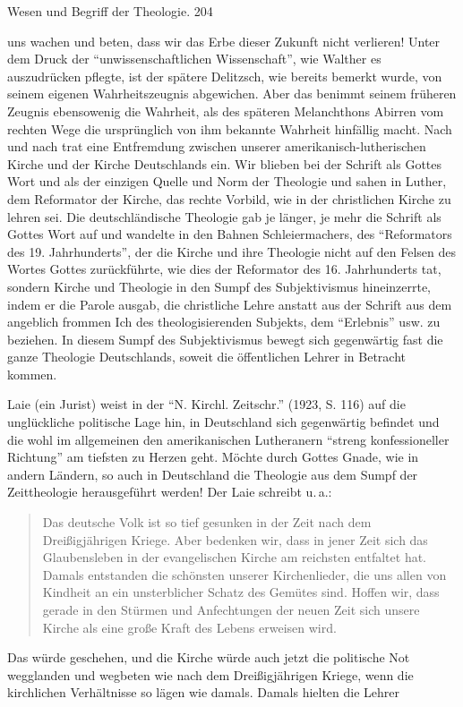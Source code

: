 \centering Wesen und Begriff der Theologie. \hfill 204\par\parlasst uns wachen und beten, dass wir das Erbe dieser Zukunft nicht verlieren! Unter dem Druck der \textquotedblleft unwissenschaftlichen Wissenschaft\textquotedblright, wie Walther es auszudrücken pflegte, ist der spätere Delitzsch, wie bereits bemerkt wurde, von seinem eigenen Wahrheitszeugnis abgewichen. Aber das benimmt seinem früheren Zeugnis ebensowenig die Wahrheit, als des späteren Melanchthons Abirren vom rechten Wege die ursprünglich von ihm bekannte Wahrheit hinfällig macht. Nach und nach trat eine Entfremdung zwischen unserer amerikanisch-lutherischen Kirche und der Kirche Deutschlands ein. Wir blieben bei der Schrift als Gottes Wort und als der einzigen Quelle und Norm der Theologie und sahen in Luther, dem Reformator der Kirche, das rechte Vorbild, wie in der christlichen Kirche zu lehren sei. Die deutschländische Theologie gab je länger, je mehr die Schrift als Gottes Wort auf und wandelte in den Bahnen Schleiermachers, des \textquotedblleft Reformators des 19. Jahrhunderts\textquotedblright, der die Kirche und ihre Theologie nicht auf den Felsen des Wortes Gottes zurückführte, wie dies der Reformator des 16. Jahrhunderts tat, sondern Kirche und Theologie in den Sumpf des Subjektivismus hineinzerrte, indem er die Parole ausgab, die christliche Lehre anstatt aus der Schrift aus dem angeblich frommen Ich des theologisierenden Subjekts, dem \textquotedblleft Erlebnis\textquotedblright{} usw. zu beziehen. In diesem Sumpf des Subjektivismus bewegt sich gegenwärtig fast die ganze Theologie Deutschlands, soweit die öffentlichen Lehrer in Betracht kommen.\par\parEin Laie (ein Jurist) weist in der \textquotedblleft N. Kirchl. Zeitschr.\textquotedblright{} (1923, S. 116) auf die unglückliche politische Lage hin, in Deutschland sich gegenwärtig befindet und die wohl im allgemeinen den amerikanischen Lutheranern \textquotedblleft streng konfessioneller Richtung\textquotedblright{} am tiefsten zu Herzen geht. Möchte durch Gottes Gnade, wie in andern Ländern, so auch in Deutschland die Theologie aus dem Sumpf der Zeittheologie herausgeführt werden! Der Laie schreibt u.\,a.: \begin{quote}Das deutsche Volk ist so tief gesunken in der Zeit nach dem Dreißigjährigen Kriege. Aber bedenken wir, dass in jener Zeit sich das Glaubensleben in der evangelischen Kirche am reichsten entfaltet hat. Damals entstanden die schönsten unserer Kirchenlieder, die uns allen von Kindheit an ein unsterblicher Schatz des Gemütes sind. Hoffen wir, dass gerade in den Stürmen und Anfechtungen der neuen Zeit sich unsere Kirche als eine große Kraft des Lebens erweisen wird.\end{quote}Das würde geschehen, und die Kirche würde auch jetzt die politische Not wegglanden und wegbeten wie nach dem Dreißigjährigen Kriege, wenn die kirchlichen Verhältnisse so lägen wie damals. Damals hielten die Lehrer